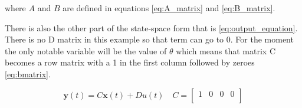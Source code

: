 \documentclass[12pt]{article}
\begin{document}
where \(A\) and \(B\) are defined in equations \eqref{eq:A_matrix} and \eqref{eq:B_matrix}.







There is also the other part of the state-space form that is \eqref{eq:output_equation}. There is no D matrix in this example so that term can go to 0. For the moment the only notable variable will be the value of $\theta$ which means that matrix C becomes a row matrix with a 1 in the first column followed by zeroes \eqref{eq:bmatrix}.

\begin{equation} \label{eq:output_equation}
    \mathbf{y}(t) = C \mathbf{x}(t) + D u(t) \quad C =
\begin{bmatrix}
1 & 0 & 0 & 0 \\
\end{bmatrix}
\end{equation}
\end{document}
